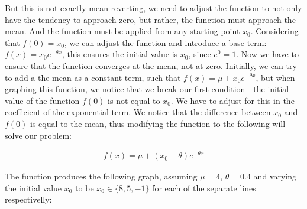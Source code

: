 \documentclass{article}
\begin{document}
\begin{spacing}{2.0}
\begin{center}
\end{center}

But this is not exactly mean reverting, we need to adjust the function to not only have the tendency to approach zero, but rather, the function must approach
the mean. And the function must be applied from any starting point $x_{0}$. Considering that $f(0) = x_{0}$, we can adjust the function and introduce a base
term: $f(x) = x_{0}e^{-\theta x}$, this ensures the initial value is $x_{0}$, since $e^{0} = 1$. Now we have to ensure that the function converges at the mean,
not at zero. Initially, we can try to add a the mean as a constant term, such that $f(x) = \mu + x_{0}e^{-\theta x}$, but when graphing this function, we notice
that we break our first condition - the initial value of the function $f(0)$ is not equal to $x_{0}$. We have to adjust for this in the coefficient of the
exponential term. We notice that the difference between $x_0$ and $f(0)$ is equal to the mean, thus modifying the function to the following will solve our problem:

\begin{gather*}
    f(x) = \mu + (x_{0} - \theta)e^{-\theta x}
\end{gather*}

The function produces the following graph, assuming $\mu = 4$, $\theta = 0.4$ and varying the initial value $x_{0}$ to be $x_{0} \in \{8, 5, -1 \} $ for each of the
separate lines respectivelly:

\begin{center}
\end{center}


\end{spacing}
\end{document}
